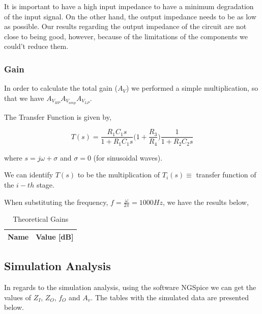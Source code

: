 It is important to have a high input impedance to have a minimum degradation of the input signal. On the other hand, the output impedance needs to be as low as possible. Our results regarding the output impedance of the circuit are not close to being good, however, because of the limitations of the components we could't reduce them. 

\subsubsection{Gain}

In order to calculate the total gain ($A_{V}$) we performed a simple multiplication, so that we have $A_{V_{HP}}A_{V_{amp}}A_{V_{LP}}$. 

The Transfer Function is given by,

\begin{equation}
    T(s)=\frac{R_1C_1s}{1+R_1C_1s}\bigg(1+\frac{R_3}{R_4}\bigg)\frac{1}{1+R_2C_2s}
\end{equation}

where $s=j\omega+\sigma$ and $\sigma=0$ (for sinusoidal waves).

We can identify $T(s)$ to be the multiplication of $T_i(s)\equiv$ transfer function of the $i-th$ stage. 

When substituting the frequency, $f=\frac{\omega}{2\pi}= 1000 Hz$, we have the results below,

\begin{table}[h]
    \centering
    \begin{tabular}{|l|c|}
    \hline
    {\bf Name} & {\bf Value [dB]} \\ \hline
    
   \end{tabular}
   \caption{Theoretical Gains}
   \label{tab:theo_gain}
\end{table}

\pagebreak

\subsection{Simulation Analysis}
\label{subsec:sim_analysis}

In regards to the simulation analysis, using the software NGSpice we can get the values of $Z_I$, $Z_O$, $f_O$ and $A_v$.
The tables with the simulated data are presented below.

